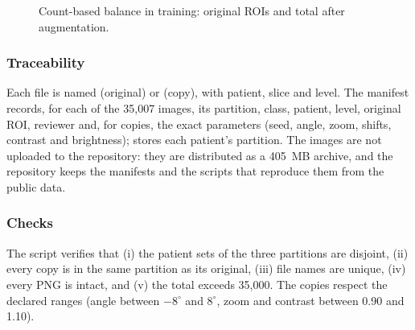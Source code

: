 \begin{figure}[!htb]
\centering
{}
\caption{Count-based balance in training: original ROIs and total after augmentation.}
\label{fig:balancechart}
\end{figure}

\subsubsection{Traceability}
Each file is named  (original) or  (copy), with patient, slice and level. The manifest  records, for each of the 35,007 images, its partition, class, patient, level, original ROI, reviewer and, for copies, the exact parameters (seed, angle, zoom, shifts, contrast and brightness);  stores each patient's partition. The images are not uploaded to the repository: they are distributed as a 405~MB archive, and the repository keeps the manifests and the scripts that reproduce them from the public data.

\subsubsection{Checks}
The script verifies that (i) the patient sets of the three partitions are disjoint, (ii) every copy is in the same partition as its original, (iii) file names are unique, (iv) every PNG is intact, and (v) the total exceeds 35,000. The copies respect the declared ranges (angle between $-8^{\circ}$ and $8^{\circ}$, zoom and contrast between 0.90 and 1.10).

